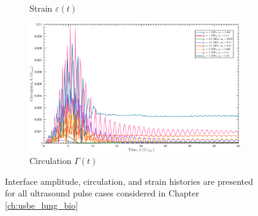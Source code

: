 \begin{figure}
\begin{subfigure}{0.5\textwidth}
    \caption{Strain $\varepsilon(t)$}
  \end{subfigure}
  \begin{subfigure}{\textwidth}
    \centering
    \includegraphics[width=\textwidth]{figs/appendix/rmawave_1_A10,25,50_a03,10,30_circulation_02-Mar-2017}
    \caption{Circulation $\Gamma(t)$}
  \end{subfigure}

  \caption{Interface amplitude, circulation, and strain histories are presented for all ultrasound pulse cases considered in Chapter \ref{ch:usbe_lung_bio}}
\end{figure}

  

